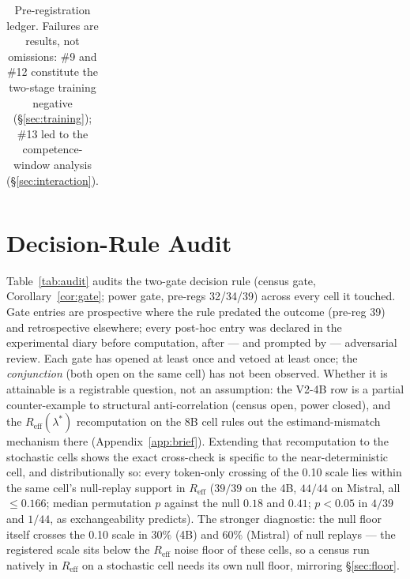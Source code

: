 \documentclass{article}
\theoremstyle{remark}
\begin{document}
\begin{table}[h]
{\begin{tabular}{clll}
\bottomrule
\end{tabular}}
\caption{Pre-registration ledger. Failures are results, not omissions:
\#9 and \#12 constitute the two-stage training negative
(\S\ref{sec:training}); \#13 led to the competence-window analysis
(\S\ref{sec:interaction}).}
\label{tab:ledger}
\end{table}

\section{Decision-Rule Audit}
\label{app:audit}
Table~\ref{tab:audit} audits the two-gate decision rule (census gate,
Corollary~\ref{cor:gate}; power gate, pre-regs 32/34/39) across every
cell it touched. Gate entries are prospective where the rule predated
the outcome (pre-reg 39) and retrospective elsewhere; every post-hoc
entry was declared in the experimental diary before computation, after
--- and prompted by --- adversarial review. Each gate has opened at
least once and vetoed at least once; the \emph{conjunction} (both open
on the same cell) has not been observed. Whether it is attainable is a
registrable question, not an assumption: the V2-4B row is a partial
counter-example to structural anti-correlation (census open, power
closed), and the $R_{\text{eff}}(\lambda^{*})$ recomputation on the 8B
cell rules out the estimand-mismatch mechanism there
(Appendix~\ref{app:brief}). Extending that recomputation to the
stochastic cells shows the exact cross-check is specific to the
near-deterministic cell, and distributionally so: every token-only
crossing of the 0.10 scale lies within the same cell's null-replay
support in $R_{\text{eff}}$ ($39/39$ on the 4B, $44/44$ on Mistral, all
$\leq 0.166$; median permutation $p$ against the null $0.18$ and
$0.41$; $p<0.05$ in $4/39$ and $1/44$, as exchangeability predicts).
The stronger diagnostic: the null floor itself crosses the 0.10 scale
in $30\%$ (4B) and $60\%$ (Mistral) of null replays --- the registered
scale sits below the $R_{\text{eff}}$ noise floor of these cells, so a
census run natively in $R_{\text{eff}}$ on a stochastic cell needs its
own null floor, mirroring \S\ref{sec:floor}.
\end{document}

